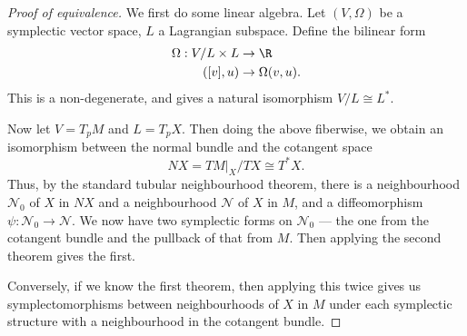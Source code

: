 \documentclass[a4paper]{article}
\begin{document}
\begin{proof}[Proof of equivalence]
  We first do some linear algebra. Let $(V, \Omega)$ be a symplectic vector space, $L$ a Lagrangian subspace. Define the bilinear form
  \begin{align*}
    \Omega: V/L \times L &\to \R\\
    ([v], u) &\to \Omega(v, u).
  \end{align*}
  This is a non-degenerate, and gives a natural isomorphism $V/L \cong L^*$.

  Now let $V = T_p M$ and $L = T_p X$. Then doing the above fiberwise, we obtain an isomorphism between the normal bundle and the cotangent space
  \[
    NX = TM|_X /TX \cong T^* X.
  \]
  Thus, by the standard tubular neighbourhood theorem, there is a neighbourhood $\mathcal{N}_0$ of $X$ in $NX$ and a neighbourhood $\mathcal{N}$ of $X$ in $M$, and a diffeomorphism $\psi: \mathcal{N}_0 \to \mathcal{N}$. We now have two symplectic forms on $\mathcal{N}_0$ --- the one from the cotangent bundle and the pullback of that from $M$. Then applying the second theorem gives the first.

  Conversely, if we know the first theorem, then applying this twice gives us symplectomorphisms between neighbourhoods of $X$ in $M$ under each symplectic structure with a neighbourhood in the cotangent bundle.
\end{proof}
\end{document}
